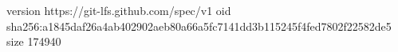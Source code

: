 version https://git-lfs.github.com/spec/v1
oid sha256:a1845daf26a4ab402902aeb80a66a5fc7141dd3b115245f4fed7802f22582de5
size 174940
